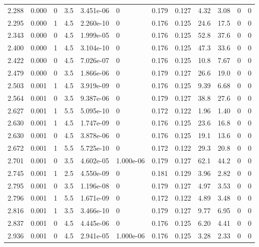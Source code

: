 \documentclass[preview]{standalone}
\begin{document}
{{{\begin{tabular}{L{1.2cm}C{1.2cm} C{0.3cm}C{0.5cm} C{1.4cm}C{1.4cm} C{1.4cm}C{1.4cm} C{1.6cm}C{1.6cm} C{1.6cm}C{1.6cm}}
  2.288  &  0.000  & 0     & 3.5 &  3.451e-06  & 0  &  0.179&   0.127& 4.32 & 3.08   &  0 & 0  \\ 
  2.295  &  0.000  & 1     & 4.5 &  2.260e-10  & 0  &  0.176&   0.125& 24.6 & 17.5   &  0 & 0  \\ 
  2.343  &  0.000  & 0     & 4.5 &  1.999e-05  & 0  &  0.176&   0.125& 52.8 & 37.6   &  0 & 0  \\ 
  2.400  &  0.000  & 1     & 4.5 &  3.104e-10  & 0  &  0.176&   0.125& 47.3 & 33.6   &  0 & 0  \\ 
  2.422  &  0.000  & 0     & 4.5 &  7.026e-07  & 0  &  0.176&   0.125& 10.8 & 7.67   &  0 & 0  \\ 
  2.479  &  0.000  & 0     & 3.5 &  1.866e-06  & 0  &  0.179&   0.127& 26.6 & 19.0   &  0 & 0  \\ 
  2.503  &  0.001  & 1     & 4.5 &  3.919e-09  & 0  &  0.176&   0.125& 9.39 & 6.68   &  0 & 0  \\ 
  2.564  &  0.001  & 0     & 3.5 &  9.387e-06  & 0  &  0.179&   0.127& 38.8 & 27.6   &  0 & 0  \\ 
  2.627  &  0.001  & 1     & 5.5 &  5.095e-10  & 0  &  0.172&   0.122& 1.96 & 1.40   &  0 & 0  \\ 
  2.630  &  0.001  & 1     & 4.5 &  1.747e-09  & 0  &  0.176&   0.125& 23.6 & 16.8   &  0 & 0  \\ 
  2.630  &  0.001  & 0     & 4.5 &  3.878e-06  & 0  &  0.176&   0.125& 19.1 & 13.6   &  0 & 0  \\ 
  2.672  &  0.001  & 1     & 5.5 &  5.725e-10  & 0  &  0.172&   0.122& 29.3 & 20.8   &  0 & 0  \\ 
  2.701  &  0.001  & 0     & 3.5 &  4.602e-05  & 1.000e-06  &  0.179&   0.127& 62.1 & 44.2   &  0 & 0  \\ 
  2.745  &  0.001  & 1     & 2.5 &  4.550e-09  & 0  &  0.181&   0.129& 3.96 & 2.82   &  0 & 0  \\ 
  2.795  &  0.001  & 0     & 3.5 &  1.196e-08  & 0  &  0.179&   0.127& 4.97 & 3.53   &  0 & 0  \\ 
  2.796  &  0.001  & 1     & 5.5 &  1.671e-09  & 0  &  0.172&   0.122& 4.89 & 3.48   &  0 & 0  \\ 
  2.816  &  0.001  & 1     & 3.5 &  3.466e-10  & 0  &  0.179&   0.127& 9.77 & 6.95   &  0 & 0  \\ 
  2.837  &  0.001  & 0     & 4.5 &  4.445e-06  & 0  &  0.176&   0.125& 6.20 & 4.41   &  0 & 0  \\ 
  2.936  &  0.001  & 0     & 4.5 &  2.941e-05  & 1.000e-06  &  0.176&   0.125& 3.28 & 2.33   &  0 & 0  \\ 

\end{tabular}}}}
\end{document}
